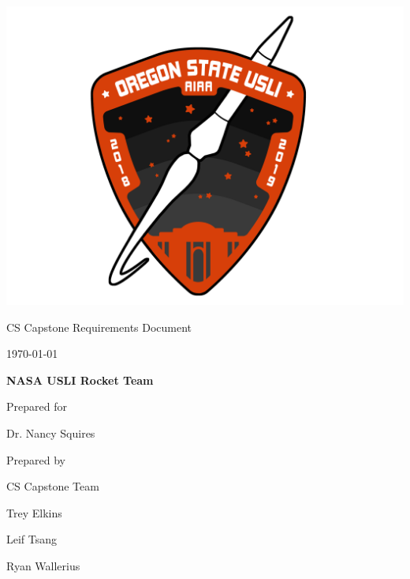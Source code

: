 \documentclass[onecolumn, draftclsnofoot, 10pt, compsoc]{IEEEtran}
\def \CapstoneTeamName{			Team 12}
\def \GroupName{				CS Capstone Team }
\def \GroupMemberOne{			Trey Elkins}
\def \GroupMemberTwo{			Leif Tsang}
\def \GroupMemberThree{			Ryan Wallerius}
\def \CapstoneProjectName{		NASA USLI Rocket Team}
\def \CapstoneSponsorCompany{	Oregon State University}
\def \CapstoneSponsorPerson{	Dr. Nancy Squires}
\def \DocType{		%
					Requirements Document
				}
\newcommand{\NameSigPair}[1]{
	\par
	\makebox[2.75in][r]{#1} \hfill
	\makebox[3.25in]{\makebox[2.25in]{\hrulefill} \hfill \makebox[.75in]{\hrulefill}}
	\par\vspace{-12pt}
	\textit{
		\tiny\noindent \makebox[2.75in]{} \hfill
		\makebox[3.25in]{\makebox[2.25in][r]{Signature} \hfill \makebox[.75in][r]{Date}}
	}
}
\renewcommand{\NameSigPair}[1]{#1}
\begin{document}
\begin{titlepage}
    \begin{singlespace}
        \hfill 
        \begin{center}
           \includegraphics[scale = 0.2]{2019patch.png}\\[1.0 cm]

        \par\vspace{.2in}
        \scshape{
            \huge CS Capstone \DocType \par
            {\large\today}\par
            \vspace{.5in}
            \textbf{\Huge\CapstoneProjectName}\par
            \vfill
            {\large Prepared for}\par
            \vspace{5pt}
            {\Large\NameSigPair{\CapstoneSponsorPerson}\par}
            {\large Prepared by }\par
           	\GroupName\par
            \vspace{5pt}
            {\Large
                \NameSigPair{\GroupMemberOne}\par
                \NameSigPair{\GroupMemberTwo}\par
                \NameSigPair{\GroupMemberThree}\par
            }
            \vspace{20pt}
        }
        \end{center}
    \end{singlespace}
    

\end{titlepage}
\end{document}

